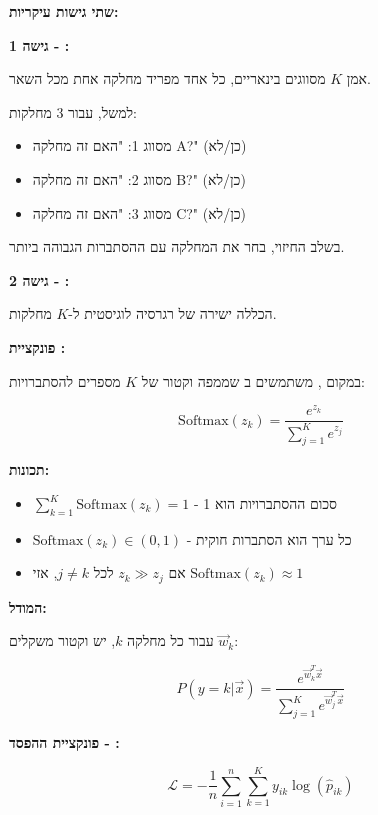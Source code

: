 \textbf{שתי גישות עיקריות:}

\textbf{גישה \num{1} - :}

אמן $K$ מסווגים בינאריים, כל אחד מפריד מחלקה אחת מכל השאר.

למשל, עבור \num{3} מחלקות:
\begin{itemize}
\item מסווג \num{1}: "האם זה מחלקה A?" (כן/לא)
\item מסווג \num{2}: "האם זה מחלקה B?" (כן/לא)
\item מסווג \num{3}: "האם זה מחלקה C?" (כן/לא)
\end{itemize}

בשלב החיזוי, בחר את המחלקה עם ההסתברות הגבוהה ביותר.

\textbf{גישה \num{2} - :}

הכללה ישירה של רגרסיה לוגיסטית ל-$K$ מחלקות.

\textbf{פונקציית :}

במקום , משתמשים ב שממפה וקטור של $K$ מספרים להסתברויות:

\begin{equation}
\text{Softmax}(z_k) = \frac{e^{z_k}}{\sum_{j=1}^{K} e^{z_j}}
\end{equation}

\textbf{תכונות:}
\begin{itemize}
\item $\sum_{k=1}^{K} \text{Softmax}(z_k) = 1$ - סכום ההסתברויות הוא \num{1}
\item $\text{Softmax}(z_k) \in (0, 1)$ - כל ערך הוא הסתברות חוקית
\item אם $z_k \gg z_j$ לכל $j \neq k$, אזי $\text{Softmax}(z_k) \approx 1$
\end{itemize}

\textbf{המודל:}

עבור כל מחלקה $k$, יש וקטור משקלים $\vec{w}_k$:

\begin{equation}
P(y=k|\vec{x}) = \frac{e^{\vec{w}_k^T\vec{x}}}{\sum_{j=1}^{K} e^{\vec{w}_j^T\vec{x}}}
\end{equation}

\textbf{פונקציית ההפסד - :}

\begin{equation}
\mathcal{L} = -\frac{1}{n}\sum_{i=1}^{n}\sum_{k=1}^{K} y_{ik} \log(\hat{p}_{ik})
\end{equation}


